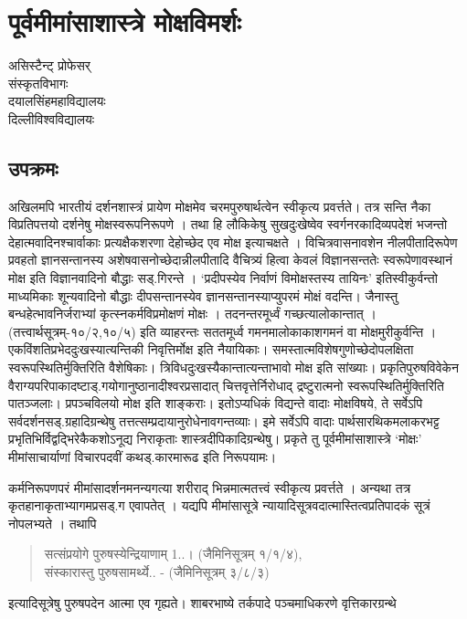 \chapter{पूर्वमीमांसाशास्त्रे मोक्षविमर्शः}

\begin{center}
\smallskip

असिस्टैन्ट् प्रोफेसर्\\
संस्कृतविभागः\\
दयालसिंहमहाविद्यालयः\\
दिल्लीविश्वविद्यालयः
\end{center}
 
\section*{उपक्रमः}

अखिलमपि भारतीयं दर्शनशास्त्रं प्रायेण मोक्षमेव चरमपुरुषार्थत्वेन स्वीकृत्य प्रवर्त्तते। तत्र सन्ति नैका विप्रतिपत्तयो दर्शनेषु मोक्षस्वरूपनिरूपणे । तथा हि लौकिकेषु सुखदुःखेष्वेव स्वर्गनरकादिव्यपदेशं भजन्तो देहात्मवादिनश्चार्वाकाः प्रत्यक्षैकशरणा देहोच्छेद एव मोक्ष इत्याचक्षते । विचित्रवासनावशेन नीलपीतादिरूपेण प्रवहतो ज्ञानसन्तानस्य अशेषवासनोच्छेदान्नीलपीतादि वैचित्र्यं हित्वा केवलं विज्ञानसन्ततेः स्वरूपेणावस्थानं मोक्ष इति विज्ञानवादिनो बौद्धाः सड्.गिरन्ते । ‘प्रदीपस्येव निर्वाणं विमोक्षस्तस्य तायिनः’ इतिस्वीकुर्वन्तो माध्यमिकाः शून्यवादिनो बौद्धाः दीपसन्तानस्येव ज्ञानसन्तानस्याप्युपरमं मोक्षं वदन्ति। जैनास्तु  बन्धहेत्भावनिर्जराभ्यां कृत्स्नकर्मविप्रमोक्षणं मोक्षः । तदनन्तरमूर्ध्वं गच्छत्यालोकान्तात् । (तत्त्वार्थसूत्रम्-१०/२,१०/५) इति व्याहरन्तः सततमूर्ध्व गमनमालोकाकाशगमनं वा मोक्षमुरीकुर्वन्ति । एकविंशतिप्रभेददुःखस्यात्यन्तिकी निवृत्तिर्मोक्ष इति नैयायिकाः। समस्तात्मविशेषगुणोच्छेदोपलक्षिता स्वरूपस्थितिर्मुक्तिरिति वैशेषिकाः। त्रिविधदुःखस्यैकान्तात्यन्ताभावो मोक्ष इति सांख्याः। प्रकृतिपुरुषविवेकेन वैराग्यपरिपाकादष्टाड्.गयोगानुष्ठानादीश्वरप्रसादात् चित्तवृत्तेर्निरोधाद् द्रष्टुरात्मनो स्वरूपस्थितिर्मुक्तिरिति पातञ्जलाः। प्रपञ्चविलयो मोक्ष इति शाङ्कराः। इतोऽप्यधिकं विद्यन्ते वादाः मोक्षविषये, ते सर्वेऽपि सर्वदर्शनसड्.ग्रहादिग्रन्थेषु तत्तत्सम्प्रदायानुरोधेनावगन्तव्याः। इमे सर्वेऽपि वादाः पार्थसारथिकमलाकरभट्ट प्रभृतिभिर्विद्वद्भिरेकैकशोऽनूद्य निराकृताः शास्त्रदीपिकादिग्रन्थेषु। प्रकृते तु पूर्वमीमांसाशास्त्रे ‘मोक्षः’ मीमांसाचार्याणां विचारपदवीं कथड्.कारमारूढ इति निरूपयामः।

कर्मनिरूपणपरं मीमांसादर्शनमनन्यगत्या शरीराद् भिन्नमात्मतत्त्वं स्वीकृत्य प्रवर्त्तते । अन्यथा तत्र कृतहानाकृताभ्यागमप्रसड्.ग एवापतेत् । यद्यपि मीमांसासूत्रे न्यायादिसूत्रवदात्मास्तित्वप्रतिपादकं सूत्रं नोपलभ्यते । तथापि 
\begin{verse}
सत्संप्रयोगे पुरुषस्येन्द्रियाणाम् 1..। (जैमिनिसूत्रम् १/­१/४), \\
संस्कारास्तु पुरुषसामर्थ्ये.. - (जैमिनिसूत्रम् ३/­८/३) 
\end{verse}
इत्यादिसूत्रेषु पुरुषपदेन आत्मा एव गृह्यते। शाबरभाष्ये तर्कपादे पञ्चमाधिकरणे वृत्तिकारग्रन्थे 

